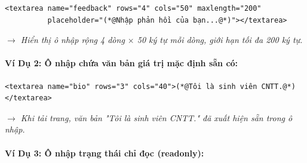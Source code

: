 \begin{codeWindow}
\begin{lstlisting}[language=HTML5]
<textarea name="feedback" rows="4" cols="50" maxlength="200" 
          placeholder="(*@Nhập phản hồi của bạn...@*)"></textarea>
\end{lstlisting}
\end{codeWindow}

\begin{browserWindow}
\sffamily\small
{} \par\vspace{4pt}
\textcolor{codeComment}{\small\textit{$\rightarrow$ Hiển thị ô nhập rộng 4 dòng $\times$ 50 ký tự mỗi dòng, giới hạn tối đa 200 ký tự.}}
\end{browserWindow}

\paragraph{Ví Dụ 2: Ô nhập chứa văn bản giá trị mặc định sẵn có:}

\begin{codeWindow}
\begin{lstlisting}[language=HTML5]
<textarea name="bio" rows="3" cols="40">(*@Tôi là sinh viên CNTT.@*)</textarea>
\end{lstlisting}
\end{codeWindow}

\begin{browserWindow}
\sffamily\small
\tcbox[arc=2pt, colback=white, colframe=primaryBlue!50, boxsep=2pt, width=0.7\linewidth, height=45pt]{
  \small\textcolor{black}{Tôi là sinh viên CNTT.}
} \par\vspace{4pt}
\textcolor{codeComment}{\small\textit{$\rightarrow$ Khi tải trang, văn bản "Tôi là sinh viên CNTT." đã xuất hiện sẵn trong ô nhập.}}
\end{browserWindow}

\paragraph{Ví Dụ 3: Ô nhập trạng thái chỉ đọc (readonly):}

